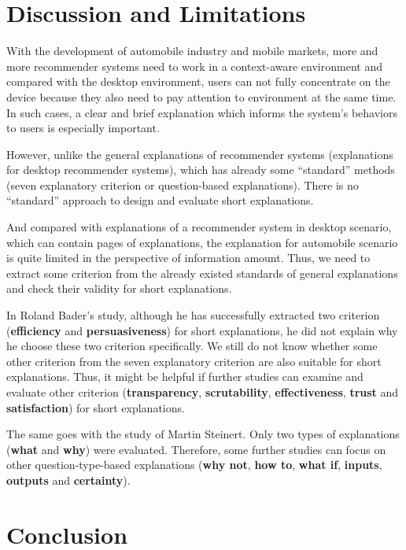 \section{Discussion and Limitations}

\indent  With the development of automobile industry and mobile markets, more and more recommender systems
need to work in a context-aware environment and compared with the desktop environment, users can 
not fully concentrate on the device because they also need to pay attention to environment at the same time.
In such cases, a clear and brief explanation which informs the system's behaviors to users is especially important.

\indent However, unlike the general explanations of recommender systems (explanations for desktop recommender systems), which has already some ``standard''
methods (seven explanatory criterion or question-based explanations).
There is no ``standard'' approach to design and evaluate short explanations. 

\indent And compared with explanations of a recommender system in desktop scenario, which can contain pages of explanations,
the explanation for automobile scenario is quite limited in the perspective of information amount. Thus, we need to extract some criterion from 
the already existed standards of general explanations and check their validity for short explanations.

\indent In Roland Bader's study, although he has successfully extracted two criterion (\textbf{efficiency} and \textbf{persuasiveness})
for short explanations, he did not explain why he choose these two criterion specifically. 
We still do not know whether some other criterion from the seven explanatory criterion are also suitable for short explanations.
Thus, it might be helpful if further studies can examine and evaluate other criterion (\textbf{transparency}, \textbf{scrutability}, \textbf{effectiveness}, \textbf{trust} and \textbf{satisfaction}) for short explanations.

The same goes with the study of Martin Steinert. Only two types of explanations (\textbf{what} and \textbf{why}) were evaluated.
Therefore, some further studies can focus on other question-type-based explanations (\textbf{why not}, \textbf{how to}, \textbf{what if}, \textbf{inputs}, \textbf{outputs} and \textbf{certainty}).

\section{Conclusion}

